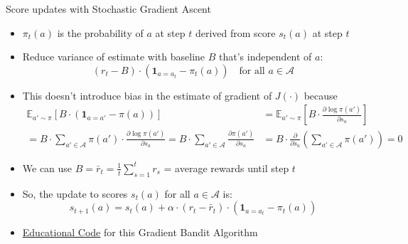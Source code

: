 \begin{frame}[shrink=25]{Score updates with Stochastic Gradient Ascent}
\begin{itemize}
    \item $\pi_t(a)$ is the probability of $a$ at step $t$ derived from score $s_t(a)$ at
          step $t$
    \item Reduce variance of estimate with baseline $B$ that's independent of $a$:
    \[
        (r_t - B) \cdot (\mathbf{1}_{a = a_t} - \pi_t(a)) \quad \text{for all } a \in \mathcal{A}
    \]
    \item This doesn't introduce bias in the estimate of gradient of $J(\cdot)$
          because
    \begin{align*}
        \mathbb{E}_{a' \sim \pi}[B \cdot (\mathbf{1}_{a = a'} - \pi(a))]
        &= \mathbb{E}_{a' \sim \pi}\!\left[B \cdot \tfrac{\partial \log \pi(a')}{\partial s_a}\right] \\
        = B \cdot \sum_{a' \in \mathcal{A}} \pi(a') \cdot \tfrac{\partial \log \pi(a')}{\partial s_a}
        = B \cdot \sum_{a' \in \mathcal{A}} \tfrac{\partial \pi(a')}{\partial s_a}
        &= B \cdot \tfrac{\partial}{\partial s_a}\!\left(\sum_{a' \in \mathcal{A}} \pi(a')\right) = 0
    \end{align*}
    \item We can use $B = \bar{r}_t = \frac{1}{t} \sum_{s=1}^{t} r_s$ = average rewards until step $t$
    \item So, the update to scores $s_t(a)$ for all $a \in \mathcal{A}$ is:
    \[
        s_{t+1}(a) = s_t(a) + \alpha \cdot (r_t - \bar{r}_t) \cdot (\mathbf{1}_{a = a_t} - \pi_t(a))
    \]
    \item \href{https://github.com/TikhonJelvis/RL-book/tree/master/rl/chapter14/gradient_bandits.py}{Educational Code} for this Gradient Bandit Algorithm
\end{itemize}
\end{frame}
